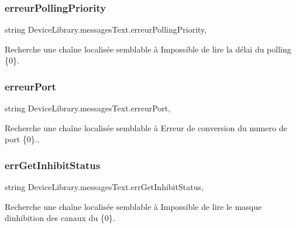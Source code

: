 \subsubsection{\texorpdfstring{erreur\+Polling\+Priority}{erreurPollingPriority}}
{\footnotesize\ttfamily string Device\+Library.\+messages\+Text.\+erreur\+Polling\+Priority\hspace{0.3cm}{\ttfamily [static]}, {\ttfamily [get]}}



Recherche une chaîne localisée semblable à Impossible de lire la délai du polling \{0\}. 

\mbox{\label{class_device_library_1_1messages_text_a54b35fb372930fed5dc13a77e060396c}} 
\subsubsection{\texorpdfstring{erreur\+Port}{erreurPort}}
{\footnotesize\ttfamily string Device\+Library.\+messages\+Text.\+erreur\+Port\hspace{0.3cm}{\ttfamily [static]}, {\ttfamily [get]}}



Recherche une chaîne localisée semblable à Erreur de conversion du numero de port \{0\}.. 

\mbox{\label{class_device_library_1_1messages_text_aa59ba4427bc96cde7bd3f125a279f09c}} 
\subsubsection{\texorpdfstring{err\+Get\+Inhibit\+Status}{errGetInhibitStatus}}
{\footnotesize\ttfamily string Device\+Library.\+messages\+Text.\+err\+Get\+Inhibit\+Status\hspace{0.3cm}{\ttfamily [static]}, {\ttfamily [get]}}



Recherche une chaîne localisée semblable à Impossible de lire le masque d\textquotesingle{}inhibition des canaux du \{0\}. 

